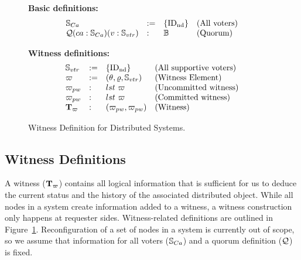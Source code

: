\begin{figure}
\raggedright
\textbf{Basic definitions:}  \\
$$
\begin{array}{llll}
\mathbb{S}_{Ca} & := & \{\mathrm{ID_{nd}}\} & \mbox{(All voters)}\\
\mathcal{Q} (ca: \mathbb{S}_{Ca}) (v: \mathbb{S}_{vtr}) &:& \mathbb{B} & \mbox{(Quorum)} \\
\end{array}
$$
\raggedright
\textbf{Witness definitions:}  \\
$$
\begin{array}{llll}
\mathbb{S}_{vtr} & := & \{\mathrm{ID_{nd}}\} & \mbox{(All supportive voters)}\\
\varpi & :=  & ( \theta, \varrho, \mathbb{S}_{vtr}) & \mbox{(Witness Element)}\\
{\varpi_{pw}} &: & lst \ \varpi   & \mbox{(Uncommitted witness)}\\
{\varpi_{pw}} &: & lst \ \varpi   & \mbox{(Committed witness)}\\
{\textbf{T}_{\varpi}} &: &  ({\varpi_{pw}} , {\varpi_{pw}}) & \mbox{(Witness)}\\
\end{array}
$$
\caption{Witness Definition for Distributed Systems.}
\label{fig:chapter:witnesspassing:witness-definition}
\end{figure}

\subsection{Witness Definitions} 
\label{chapte:witnesspassing:subsec:witness-definition}

A witness (${\textbf{T}_{\varpi}}$) contains all logical information that is sufficient for us to deduce the current status and the history of the associated distributed object. 
While all nodes in a system create information added to a witness, a witness construction only
happens at requester sides. Witness-related definitions are outlined in
Figure~\ref{fig:chapter:witnesspassing:witness-definition}.
Reconfiguration of a set of nodes in a system is currently out of scope, so we assume that information for all voters ($\mathbb{S}_{Ca}$) and a quorum definition ($\mathcal{Q}$) is fixed.

